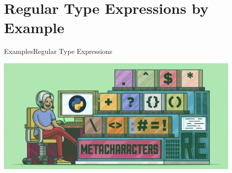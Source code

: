 \section{Regular Type Expressions by Example}

{  %
\begin{frame}{Examples}{Regular Type Expressions}
  \centering
  
  \includegraphics[width=0.9\textwidth]{regexp.png}
\end{frame}
}

